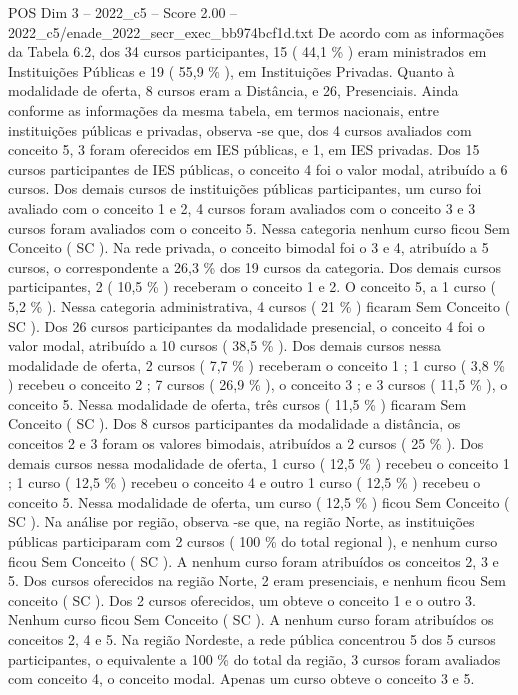\begin{textsample}{POS Dim 3 – 2022\_c5 – Score 2.00 – 2022\_c5/enade\_2022\_secr\_exec\_bb974bcf1d.txt}
De acordo com as informações da Tabela 6.2, dos 34 cursos participantes, 15 ( 44,1 \% ) eram ministrados em Instituições Públicas e 19 ( 55,9 \% ), em Instituições Privadas.
Quanto à modalidade de oferta, 8 cursos eram a Distância, e 26, Presenciais.
Ainda conforme as informações da mesma tabela, em termos nacionais, entre instituições públicas e privadas, observa -se que, dos 4 cursos avaliados com conceito 5, 3 foram oferecidos em IES públicas, e 1, em IES privadas.
Dos 15 cursos participantes de IES públicas, o conceito 4 foi o valor modal, atribuído a 6 cursos.
Dos demais cursos de instituições públicas participantes, um curso foi avaliado com o conceito 1 e 2, 4 cursos foram avaliados com o conceito 3 e 3 cursos foram avaliados com o conceito 5.
Nessa categoria nenhum curso ficou Sem Conceito ( SC ).
Na rede privada, o conceito bimodal foi o 3 e 4, atribuído a 5 cursos, o correspondente a 26,3 \% dos 19 cursos da categoria.
Dos demais cursos participantes, 2 ( 10,5 \% ) receberam o conceito 1 e 2.
O conceito 5, a 1 curso ( 5,2 \% ).
Nessa categoria administrativa, 4 cursos ( 21 \% ) ficaram Sem Conceito ( SC ).
Dos 26 cursos participantes da modalidade presencial, o conceito 4 foi o valor modal, atribuído a 10 cursos ( 38,5 \% ).
Dos demais cursos nessa modalidade de oferta, 2 cursos ( 7,7 \% ) receberam o conceito 1 ; 1 curso ( 3,8 \% ) recebeu o conceito 2 ; 7 cursos ( 26,9 \% ), o conceito 3 ; e 3 cursos ( 11,5 \% ), o conceito 5.
Nessa modalidade de oferta, três cursos ( 11,5 \% ) ficaram Sem Conceito ( SC ).
Dos 8 cursos participantes da modalidade a distância, os conceitos 2 e 3 foram os valores bimodais, atribuídos a 2 cursos ( 25 \% ).
Dos demais cursos nessa modalidade de oferta, 1 curso ( 12,5 \% ) recebeu o conceito 1 ; 1 curso ( 12,5 \% ) recebeu o conceito 4 e outro 1 curso ( 12,5 \% ) recebeu o conceito 5.
Nessa modalidade de oferta, um curso ( 12,5 \% ) ficou Sem Conceito ( SC ).
Na análise por região, observa -se que, na região Norte, as instituições públicas participaram com 2 cursos ( 100 \% do total regional ), e nenhum curso ficou Sem Conceito ( SC ).
A nenhum curso foram atribuídos os conceitos 2, 3 e 5.
Dos cursos oferecidos na região Norte, 2 eram presenciais, e nenhum ficou Sem conceito ( SC ).
Dos 2 cursos oferecidos, um obteve o conceito 1 e o outro 3.
Nenhum curso ficou Sem Conceito ( SC ).
A nenhum curso foram atribuídos os conceitos 2, 4 e 5.
Na região Nordeste, a rede pública concentrou 5 dos 5 cursos participantes, o equivalente a 100 \% do total da região, 3 cursos foram avaliados com conceito 4, o conceito modal.
Apenas um curso obteve o conceito 3 e 5.

\end{textsample}

